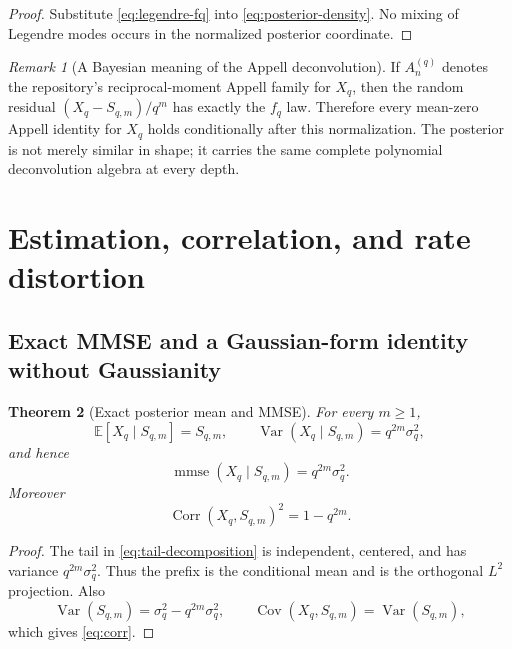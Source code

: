 \documentclass[11pt,oneside]{article}
\newtheorem{theorem}{Theorem}[section]
\theoremstyle{definition}
\theoremstyle{remark}
\newtheorem{remark}[theorem]{Remark}
\newcommand{\E}{\mathbb E}
\newcommand{\Var}{\operatorname{Var}}
\newcommand{\Cov}{\operatorname{Cov}}
\newcommand{\Corr}{\operatorname{Corr}}
\newcommand{\mmse}{\operatorname{mmse}}
\begin{document}
\begin{proof}
Substitute \eqref{eq:legendre-fq} into \eqref{eq:posterior-density}.  No mixing of
Legendre modes occurs in the normalized posterior coordinate.
\end{proof}

\begin{remark}[A Bayesian meaning of the Appell deconvolution]
If $A_n^{(q)}$ denotes the repository's reciprocal-moment Appell family for
$X_q$, then the random residual $(X_q-S_{q,m})/q^m$ has exactly the $f_q$ law.
Therefore every mean-zero Appell identity for $X_q$ holds conditionally after this
normalization.  The posterior is not merely similar in shape; it carries the same
complete polynomial deconvolution algebra at every depth.
\end{remark}

\section{Estimation, correlation, and rate distortion}
\label{sec:estimation}

\subsection{Exact MMSE and a Gaussian-form identity without Gaussianity}

\begin{theorem}[Exact posterior mean and MMSE]
\label{thm:mmse}
For every $m\ge1$,
\begin{equation}
 \E[X_q\mid S_{q,m}]=S_{q,m},
 \qquad
 \Var(X_q\mid S_{q,m})=q^{2m}\sigma_q^2,
 \label{eq:conditional-mean-var}
\end{equation}
and hence
\begin{equation}
 \boxed{\mmse(X_q\mid S_{q,m})=q^{2m}\sigma_q^2.}
 \label{eq:mmse}
\end{equation}
Moreover
\begin{equation}
 \Corr(X_q,S_{q,m})^2=1-q^{2m}.
 \label{eq:corr}
\end{equation}
\end{theorem}

\begin{proof}
The tail in \eqref{eq:tail-decomposition} is independent, centered, and has
variance $q^{2m}\sigma_q^2$.  Thus the prefix is the conditional mean and is the
orthogonal $L^2$ projection.  Also
\[
 \Var(S_{q,m})=\sigma_q^2-q^{2m}\sigma_q^2,
 \qquad
 \Cov(X_q,S_{q,m})=\Var(S_{q,m}),
\]
which gives \eqref{eq:corr}.
\end{proof}
\end{document}
